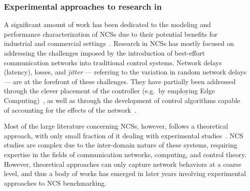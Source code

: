 \subsubsection{Experimental approaches to research in }

A significant amount of work has been dedicated to the modeling and performance characterization of \glspl{NCS} due to their potential benefits for industrial and commercial settings~\cite{lu2016real,hespanha2007survey,zhang2013network,zhang2016survey}.
Research in \glspl{NCS} has mostly focused on addressing the challenges imposed by the introduction of best-effort communication networks into traditional control systems.
Network delays (latency), losses, and \emph{jitter} --- referring to the variation in random network delays --- are at the forefront of these challenges.
They have partially been addressed through the clever placement of the controller (e.g.\ by employing Edge Computing)~\cite{sasaki2017layered,sasaki2016vehicle}, as well as through the development of control algorithms capable of accounting for the effects of the network~\cite{zhang2013network}.

Most of the large literature concerning \glspl{NCS}, however, follows a theoretical approach, with only small fraction of it dealing with experimental studies~\cite{zhang2019networked}.
\gls{NCS} studies are complex due to the inter-domain nature of these systems, requiring expertise in the fields of communication networks, computing, and control theory.
However, theoretical approaches can only capture network behaviors at a coarse level, and thus a body of works has emerged in later years involving experimental approaches to \gls{NCS} benchmarking.

